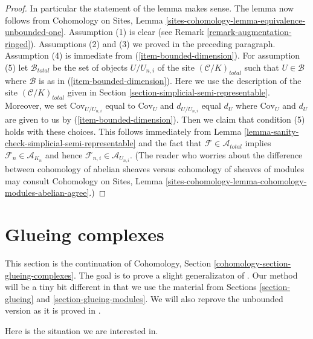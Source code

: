 \begin{proof}
\medskip\noindent
In particular the statement of the lemma makes sense.
The lemma now follows from Cohomology on Sites,
Lemma \ref{sites-cohomology-lemma-equivalence-unbounded-one}.
Assumption (1) is clear (see Remark \ref{remark-augmentation-ringed}).
Assumptions (2) and (3) we proved in the preceding paragraph.
Assumption (4) is immediate from (\ref{item-bounded-dimension}).
For assumption (5) let $\mathcal{B}_{total}$ be the set of
objects $U/U_{n, i}$ of the site $(\mathcal{C}/K)_{total}$
such that $U \in \mathcal{B}$ where $\mathcal{B}$ is as in
(\ref{item-bounded-dimension}). Here we use the description of
the site $(\mathcal{C}/K)_{total}$ given in
Section \ref{section-simplicial-semi-representable}.
Moreover, we set $\text{Cov}_{U/U_{n, i}}$ equal to $\text{Cov}_U$
and $d_{U/U_{n, i}}$ equal $d_U$ where $\text{Cov}_U$ and $d_U$
are given to us by (\ref{item-bounded-dimension}).
Then we claim that condition (5) holds with these choices.
This follows immediately from
Lemma \ref{lemma-sanity-check-simplicial-semi-representable}
and the fact that $\mathcal{F} \in \mathcal{A}_{total}$
implies $\mathcal{F}_n \in \mathcal{A}_{K_n}$ and hence
$\mathcal{F}_{n, i} \in \mathcal{A}_{U_{n, i}}$.
(The reader who worries about the difference between
cohomology of abelian sheaves versus cohomology
of sheaves of modules may consult Cohomology on Sites, Lemma
\ref{sites-cohomology-lemma-cohomology-modules-abelian-agree}.)
\end{proof}










\section{Glueing complexes}
\label{section-glueing-complexes}

\noindent
This section is the continuation of
Cohomology, Section \ref{cohomology-section-glueing-complexes}.
The goal is to prove a slight generalizaton of \cite[Theorem 3.2.4]{BBD}.
Our method will be a tiny bit different in that we use
the material from Sections \ref{section-glueing} and
\ref{section-glueing-modules}. We will also reprove the
unbounded version as it is proved in \cite{six-I}.

\medskip\noindent
Here is the situation we are interested in.

